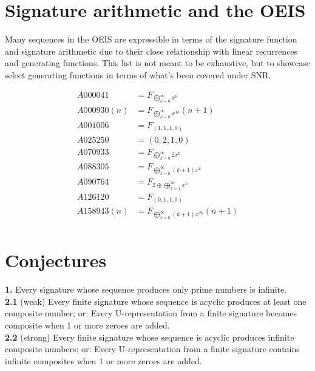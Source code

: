 \documentclass{article}
\begin{document}
\pagebreak

\section{Signature arithmetic and the OEIS}

Many sequences in the OEIS are expressible in terms of the signature function and signature arithmetic due to their close relationship with linear recurrences and generating functions. This list is not meant to be exhaustive, but to showcase select generating functions in terms of what's been covered under SNR.

\begin{align*}
A000041 &= F_{\displaystyle \bigoplus_{k=0}^{\infty} x^k}\\
A000930(n) &= F_{\displaystyle \bigoplus_{k=0}^{\infty} x^{3k}}(n+1)\\
A001006 &= F_{(1, 1, 1, 0)}\\
A025250 &= (0, 2, 1, 0)\\
A070933 &= F_{\displaystyle \bigoplus_{k=0}^{\infty} 2x^k}\\
A088305 &= F_{\displaystyle \bigoplus_{k=0}^{\infty} (k+1)x^k}\\
A090764 &= F_{2 \oplus \displaystyle \bigoplus_{k=1}^{\infty} x^k}\\
A126120 &= F_{(0, 1, 1, 0)}\\
A158943(n) &= F_{\displaystyle \bigoplus_{k=0}^{\infty} (k+1)x^{2k}}(n+1)\\
\end{align*}

\pagebreak

\section{Conjectures}

\textbf{1.} Every signature whose sequence produces only prime numbers is infinite.\\

\noindent \textbf{2.1} (weak) Every finite signature whose sequence is acyclic produces at least one composite number; or: Every U-representation from a finite signature becomes composite when 1 or more zeroes are added.\\

\noindent \textbf{2.2} (strong) Every finite signature whose sequence is acyclic produces infinite composite numbers; or: Every U-representation from a finite signature contains infinite composites when 1 or more zeroes are added.\\
\end{document}
